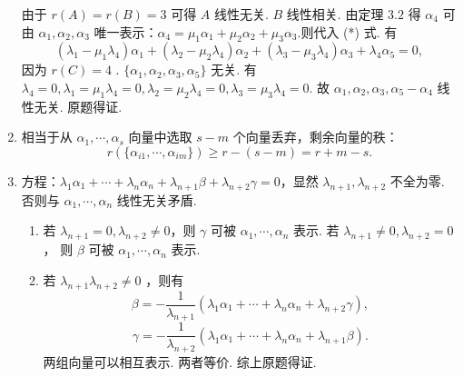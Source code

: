 \begin{enumerate}
	由于 $r(A)=r(B)=3$ 可得 $A$ 线性无关. $B$ 线性相关. 由定理 $3.2$ 得 $\alpha_4$ 可由 $\alpha_1,\alpha_2,\alpha_3$ 唯一表示：$\alpha_4=\mu_1\alpha_1+\mu_2\alpha_2+\mu_3\alpha_3$.则代入 (*) 式. 有
	\[(\lambda_1-\mu_1\lambda_4)\alpha_1+(\lambda_2-\mu_2\lambda_4)\alpha_2+(\lambda_3-\mu_3\lambda_4)\alpha_3+\lambda_4\alpha_5=0,\]
	因为 $r(C)=4$ . $\{\alpha_1,\alpha_2,\alpha_3,\alpha_5\}$ 无关. 有 $\lambda_4=0,\lambda_1=\mu_1\lambda_4=0,\lambda_2=\mu_2\lambda_4=0,\lambda_3=\mu_3\lambda_4=0$. 故 $\alpha_1,\alpha_2,\alpha_3,\alpha_5-\alpha_4$ 线性无关. 原题得证.
    \item 相当于从 $\alpha_1,\cdots,\alpha_s$ 向量中选取 $s-m$ 个向量丢弃，剩余向量的秩：
	\[r(\{\alpha_{i1},\cdots,\alpha_{im}\})\ge r-(s-m) =r+m-s.\]
    \item 方程：$\lambda_1\alpha_1+\cdots+\lambda_n\alpha_n+\lambda_{n+1}\beta+\lambda_{n+2}\gamma=0$，显然 $\lambda_{n+1},\lambda_{n+2}$ 不全为零. 否则与 $\alpha_1,\cdots,\alpha_n$ 线性无关矛盾.
	\begin{enumerate}
        \item 若 $\lambda_{n+1}=0,\lambda_{n+2}\ne0$，则 $\gamma$ 可被 $\alpha_1,\cdots,\alpha_n$ 表示. 若 $\lambda_{n+1}\ne0,\lambda_{n+2}=0$， 则 $\beta$ 可被 $\alpha_1,\cdots,\alpha_n$ 表示.
        \item 若 $\lambda_{n+1}\lambda_{n+2}\ne 0$ ，则有
        \[\beta=-\frac 1{\lambda_{n+1}}(\lambda_1\alpha_1+\cdots+\lambda_n\alpha_n+\lambda_{n+2}\gamma),\]
        \[\gamma=-\frac 1{\lambda_{n+2}}(\lambda_1\alpha_1+\cdots+\lambda_n\alpha_n+\lambda_{n+1}\beta).\]
        两组向量可以相互表示. 两者等价. 综上原题得证.
    \end{enumerate}
\end{enumerate}

